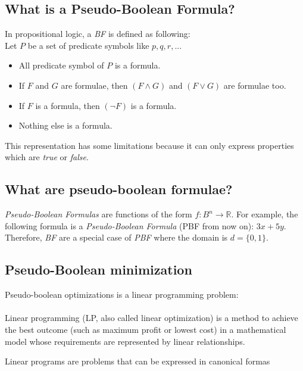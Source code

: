 \subsection{What is a Pseudo-Boolean Formula?}
In propositional logic, a \emph{BF} is defined as following\cite{Lpo}:\\
Let $P$ be a set of predicate symbols like $p,q,r,...$
\begin{itemize}
	\item All predicate symbol of $P$ is a formula.
	\item If $F$ and $G$ are formulae, then $(F \land G)$ and $(F \lor G)$ are formulae too.
	\item If $F$ is a formula, then $(\neg F)$ is a formula.
	\item Nothing else is a formula.
\end{itemize}
This representation has some limitations because it can only express properties which are \emph{true} or \emph{false}.\\


\subsection{What are pseudo-boolean formulae?}

\emph{Pseudo-Boolean Formulas} are functions of the form $f:B^n \rightarrow \mathbb{R}$. For example, the following formula is a \emph{Pseudo-Boolean Formula} (PBF from now on): $3x+5y$. Therefore, \emph{BF} are a special case of \emph{PBF} where the domain is $d=\{0,1\}$.\\



\subsection{Pseudo-Boolean minimization}
Pseudo-boolean optimizations is a linear programming problem: \\\\
\noindent\makebox[\linewidth]{\rule{\linewidth}{0.4pt}}
Linear programming (LP, also called linear optimization) is a method to achieve the best
outcome (such as maximum profit or lowest cost) in a mathematical model whose requirements
are represented by linear relationships. 

Linear programs are problems that can be expressed in canonical formas

